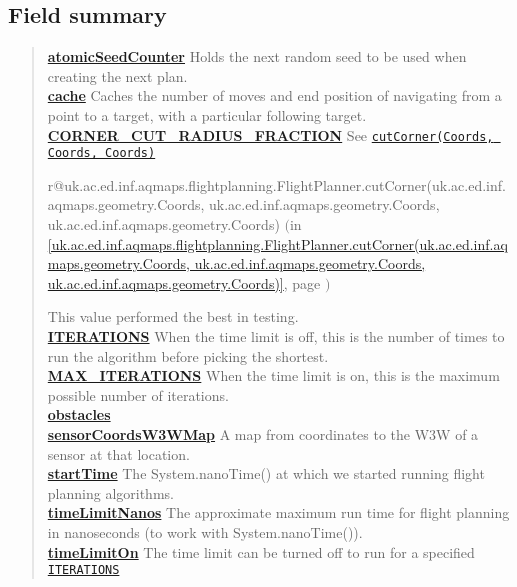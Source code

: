 \documentclass[11pt,a4paper]{report}
\makeatletter
\newcommand{\refdefined}[1]{
\expandafter\ifx\csname r@#1\endcsname\relax
\relax\else
{$($in \ref{#1}, page \pageref{#1}$)$}\fi}
\makeatother
\begin{document}
{{{{{{{{{{{{{{{{{\subsection{Field summary}{
\begin{verse}
\hyperlink{uk.ac.ed.inf.aqmaps.flightplanning.FlightPlanner.atomicSeedCounter}{{\bf atomicSeedCounter}} Holds the next random seed to be used when creating the next plan.\\
\hyperlink{uk.ac.ed.inf.aqmaps.flightplanning.FlightPlanner.cache}{{\bf cache}} Caches the number of moves and end position of navigating from a point to a target, with a particular following target.\\
\hyperlink{uk.ac.ed.inf.aqmaps.flightplanning.FlightPlanner.CORNER_CUT_RADIUS_FRACTION}{{\bf CORNER\_CUT\_RADIUS\_FRACTION}} See \texttt{\small \hyperlink{uk.ac.ed.inf.aqmaps.flightplanning.FlightPlanner.cutCorner(uk.ac.ed.inf.aqmaps.geometry.Coords, uk.ac.ed.inf.aqmaps.geometry.Coords, uk.ac.ed.inf.aqmaps.geometry.Coords)}{cutCorner(Coords, Coords, Coords)}}{\small 
\refdefined{uk.ac.ed.inf.aqmaps.flightplanning.FlightPlanner.cutCorner(uk.ac.ed.inf.aqmaps.geometry.Coords, uk.ac.ed.inf.aqmaps.geometry.Coords, uk.ac.ed.inf.aqmaps.geometry.Coords)}} This value performed the best in testing.\\
\hyperlink{uk.ac.ed.inf.aqmaps.flightplanning.FlightPlanner.ITERATIONS}{{\bf ITERATIONS}} When the time limit is off, this is the number of times to run the algorithm before picking the shortest.\\
\hyperlink{uk.ac.ed.inf.aqmaps.flightplanning.FlightPlanner.MAX_ITERATIONS}{{\bf MAX\_ITERATIONS}} When the time limit is on, this is the maximum possible number of iterations.\\
\hyperlink{uk.ac.ed.inf.aqmaps.flightplanning.FlightPlanner.obstacles}{{\bf obstacles}} \\
\hyperlink{uk.ac.ed.inf.aqmaps.flightplanning.FlightPlanner.sensorCoordsW3WMap}{{\bf sensorCoordsW3WMap}} A map from coordinates to the W3W of a sensor at that location.\\
\hyperlink{uk.ac.ed.inf.aqmaps.flightplanning.FlightPlanner.startTime}{{\bf startTime}} The System.nanoTime() at which we started running flight planning algorithms.\\
\hyperlink{uk.ac.ed.inf.aqmaps.flightplanning.FlightPlanner.timeLimitNanos}{{\bf timeLimitNanos}} The approximate maximum run time for flight planning in nanoseconds (to work with System.nanoTime()).\\
\hyperlink{uk.ac.ed.inf.aqmaps.flightplanning.FlightPlanner.timeLimitOn}{{\bf timeLimitOn}} The time limit can be turned off to run for a specified \texttt{\small \hyperlink{uk.ac.ed.inf.aqmaps.flightplanning.FlightPlanner.ITERATIONS}{ITERATIONS}}{\small 
}
\end{verse}}}}}}}}}}}}}}}}}}}
\end{document}
